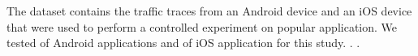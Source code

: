 The \mobexpt dataset contains the traffic traces from an Android device and an iOS device that were used to perform a controlled experiment on popular application. 
We tested  of Android applications and  of iOS application for this study. 
.  .

